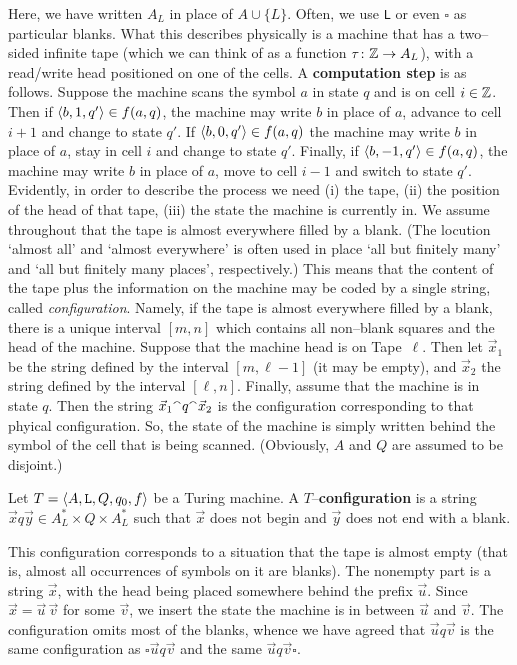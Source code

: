Here, we have written $A_L$ in place of $A \cup \{L\}$. Often,
we use {\tt L} or even $\square$ as particular blanks. What
this describes physically is a machine that has a two--sided
infinite tape (which we can think of as a function $\tau \colon
\mathbb{Z} \rightarrow A_L$), with a read/write head positioned on one of the cells.
A \textbf{computation step} 
is as follows. Suppose the machine
scans the symbol $a$ in state $q$ and is on cell $i \in \mathbb{Z}$.
Then if $\langle b, 1, q'\rangle \in f(a,q)$, the machine may write
$b$ in place of $a$, advance to cell $i+1$ and change to state
$q'$. If $\langle b, 0, q'\rangle \in f(a,q)$ the machine may
write $b$ in place of $a$, stay in cell $i$ and change
to state $q'$. Finally, if $\langle b,-1,q'\rangle \in f(a,q)$,
the machine may write $b$ in place of $a$, move to cell $i-1$
and switch to state $q'$. Evidently, in order to describe
the process we need (i) the tape, (ii) the position of the
head of that tape, (iii) the state the machine is currently
in. We assume throughout that the tape is almost everywhere 
filled by a blank. (The locution `almost all' and `almost everywhere' 
is often used in place `all but finitely many' and `all but finitely 
many places', respectively.) This means that 
the content of the tape plus the information on the machine may be 
coded by a single string, called {\it configuration}. Namely, if the 
tape is almost everywhere filled by a blank, there is a unique 
interval $[m, n]$ which contains all non--blank squares and 
the head of the machine. Suppose that the machine head is 
on Tape~$\ell$. Then let $\vec{x}_1$ be the string defined 
by the interval $[m, \ell -1]$ (it may be empty), and 
$\vec{x}_2$ the string defined by the interval $[\ell, n]$. 
Finally, assume that the machine is in state $q$. Then the 
string $\vec{x}_1{^{\smallfrown}} q {^{\smallfrown}} \vec{x}_2$ is the configuration 
corresponding to that phyical configuration.  So, the state
of the machine is simply written behind the symbol of the
cell that is being scanned. (Obviously, $A$ and $Q$ are assumed 
to be disjoint.)
\begin{defn}
\label{defn:configuration}
Let $T = \langle A, \mbox{\tt L}, Q, q_0, f\rangle$ be a Turing machine.
A $T$--\textbf{con\-fi\-gu\-ra\-tion} is a string $\vec{x}q\vec{y} \in
A_L^{\ast} \times Q \times A_L^{\ast}$ such that
$\vec{x}$ does not begin and $\vec{y}$ does not end
with a blank.
\end{defn}
This configuration corresponds to a situation that the tape
is almost empty (that is, almost all occurrences of symbols on
it are blanks). The nonempty part is a string $\vec{x}$, with
the head being placed somewhere behind the prefix $\vec{u}$.
Since $\vec{x} = \vec{u}\, \vec{v}$ for some $\vec{v}$, we insert
the state the machine is in between $\vec{u}$ and $\vec{v}$.
The configuration omits most of the blanks, whence we have
agreed that $\vec{u}q\vec{v}$ is the same configuration as
$\square\vec{u}q\vec{v}$ and the same $\vec{u}q\vec{v}\square$.

